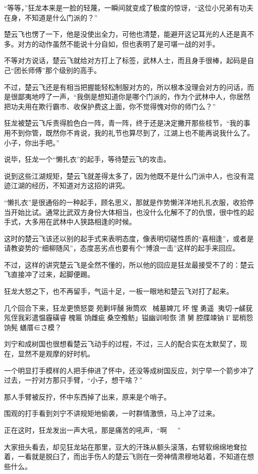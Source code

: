 “等等，”狂龙本来是一脸的轻蔑，一瞬间就变成了极度的惊讶，“这位小兄弟有功夫在身，不知道是什么门派的？”

楚云飞也愣了一下，他是没使出全力，可他也清楚，能避开这记耳光的人还是真不多。对方的动作虽然不能说十分自如，但也表明了是可堪一战的对手。

不等对方说话，楚云飞就给对方打上了标签，武林人士，而且身手很棒，起码是自己“团长师傅”那个级别的高手。

不过，楚云飞还是有相当把握能轻松制服对方的，所以根本没理会对方的问话，而是很鄙夷地哼了一声，“我倒是想知道你是哪个门派的，作为个武林中人，你居然把功夫用在欺行霸市、收保护费这上面，你不觉得愧对你的师门么？”

狂龙被楚云飞斥责得脸色白一阵，青一阵，终于还是决定撇开那些枝节，“我的事用不到你管，既然你不肯说，我的礼节也算尽到了，江湖上也不能再说我什么了。小子，你出手吧。”

说毕，狂龙一个“懒扎衣”的起手，等待楚云飞的攻击。

说到这些江湖规矩，楚云飞就差得太多了，因为他既不是什么门派中人，也没有混迹江湖的经历，不知道对方这招的讲究。

“懒扎衣”是很通俗的一种起手，顾名思义，那就是作势懒洋洋地扎扎衣服，收拾停当开始比试。通常比武双方身份大体相当，也没什么化解不了的仇恨，很中性的起手式，大多用在武林中人狭路相逢的时候。

这时的楚云飞该还以别的起手式来表明态度，像表明切磋性质的“喜相逢”，或者是请教姿势的“细柳随风”，态度恶劣点也要有个“博浪一击”这样的起手来回应。

不过，这样的讲究楚云飞是全然不懂的，所以他的回应是狂龙最接受不了的：楚云飞直接冲了过来，起脚便踢。

狂龙大怒之下，也不再留手，气运十足，一板一眼地和楚云飞对打了起来。

几个回合下来，狂龙更愤怒耍苑剿坪醺揪筒欢械墓婢兀坏惺勇遥夷切┮鹾莸氖侄我彩遣愠霾磺睿槐匾饷雌疵桑空飧鲂」镒幽训啦恢溃舅腔牒竦钠Γ罂梢怨饷髡蟮厝∈さ模？

刘宁和成树国也很想看楚云飞动手的过程，不过，三人的配合实在太默契了，现在，显然不是观摩的好时机。

一个明显打手模样的人把手伸进了怀中，还没等成树国反应，刘宁早一个箭步冲了过去，一拧对方那只手臂，“小子，想干啥？”

那人手臂被反拧，怀中东西掉了出来，原来是个哨子。

围观的打手看到刘宁不讲规矩地偷袭，一时群情激愤，马上冲了过来。

正在这时，狂龙发出一声大吼，那是痛苦的吼声，“啊~~~”

大家扭头看去，却见狂龙站在那里，豆大的汗珠从额头滚落，右臂软绵绵地耷拉着，一看就是脱臼了，而出手伤人的楚云飞则在一旁神情肃穆地站着，不知道在想些什么。

